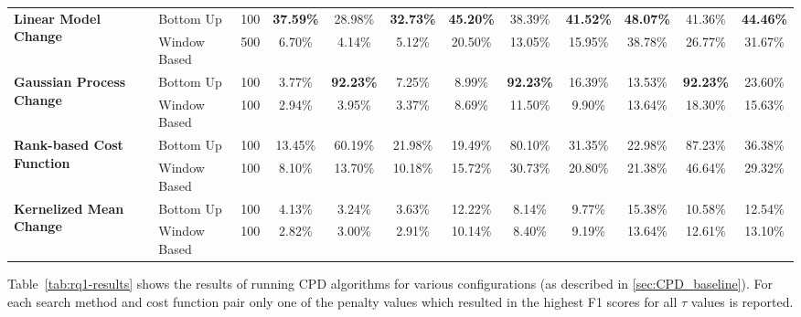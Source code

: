 \begin{table}
{\begin{tabular}{llcccccccccc}
\multirow{2}{*}{\textbf{Linear Model Change}}      & Bottom Up    & 100  & \textbf{37.59\%}    & 28.98\%    & \textbf{32.73\%}   & \textbf{45.20\%}    & 38.39\%    & \textbf{41.52\%}   & \textbf{48.07\%}    & 41.36\%    & \textbf{44.46\% }  \\
                                                   & Window Based & 500  & 6.70\%     & 4.14\%     & 5.12\%    & 20.50\%    & 13.05\%    & 15.95\%   & 38.78\%    & 26.77\%    & 31.67\%   \\ \midrule
\multirow{2}{*}{\textbf{Gaussian Process Change}}  & Bottom Up    & 100  & 3.77\%     & \textbf{92.23\%}    & 7.25\%    & 8.99\%     & \textbf{92.23\%}    & 16.39\%   & 13.53\%    & \textbf{92.23\%}    & 23.60\%   \\
                                                   & Window Based & 100  & 2.94\%     & 3.95\%     & 3.37\%    & 8.69\%     & 11.50\%    & 9.90\%    & 13.64\%    & 18.30\%    & 15.63\%   \\ \midrule
\multirow{2}{*}{\textbf{Rank-based Cost Function}} & Bottom Up    & 100  & 13.45\%    & 60.19\%    & 21.98\%   & 19.49\%    & 80.10\%    & 31.35\%   & 22.98\%    & 87.23\%    & 36.38\%   \\
                                                   & Window Based & 100  & 8.10\%     & 13.70\%    & 10.18\%   & 15.72\%    & 30.73\%    & 20.80\%   & 21.38\%    & 46.64\%    & 29.32\%   \\ \midrule
\multirow{2}{*}{\textbf{Kernelized Mean Change}}   & Bottom Up    & 100  & 4.13\%     & 3.24\%     & 3.63\%    & 12.22\%    & 8.14\%     & 9.77\%    & 15.38\%    & 10.58\%    & 12.54\%   \\
                                                   & Window Based & 100  & 2.82\%     & 3.00\%     & 2.91\%    & 10.14\%    & 8.40\%     & 9.19\%    & 13.64\%    & 12.61\%    & 13.10\%   \\ \bottomrule

                                                   
\end{tabular}%
}
\end{table}

Table~\ref{tab:rq1-results} shows the results of running CPD algorithms for various configurations (as described in \ref{sec:CPD_baseline}). For each search method and cost function pair only one of the penalty values which resulted in the highest F1 scores for all $\tau$ values is reported. 

